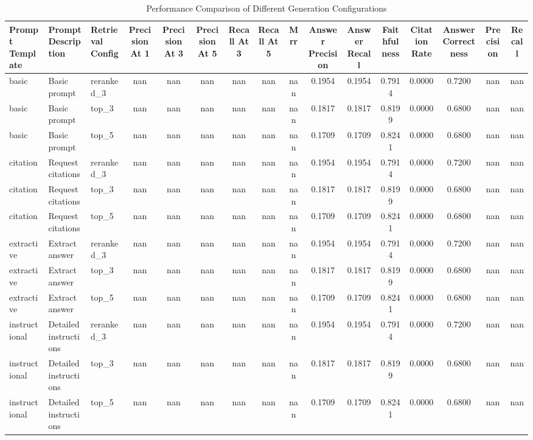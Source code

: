 \begin{table}[htbp]
\caption{Performance Comparison of Different Generation Configurations}
\begin{center}
\begin{tabular}{|l|l|l|c|c|c|c|c|c|c|c|c|c|c|c|c|}
\hline
\textbf{Prompt Template} & \textbf{Prompt Description} & \textbf{Retrieval Config} & \textbf{Precision At 1} & \textbf{Precision At 3} & \textbf{Precision At 5} & \textbf{Recall At 3} & \textbf{Recall At 5} & \textbf{Mrr} & \textbf{Answer Precision} & \textbf{Answer Recall} & \textbf{Faithfulness} & \textbf{Citation Rate} & \textbf{Answer Correctness} & \textbf{Precision} & \textbf{Recall} \\ 
\hline
basic & Basic prompt & reranked_3 & nan & nan & nan & nan & nan & nan & 0.1954 & 0.1954 & 0.7914 & 0.0000 & 0.7200 & nan & nan \\ 
basic & Basic prompt & top_3 & nan & nan & nan & nan & nan & nan & 0.1817 & 0.1817 & 0.8199 & 0.0000 & 0.6800 & nan & nan \\ 
basic & Basic prompt & top_5 & nan & nan & nan & nan & nan & nan & 0.1709 & 0.1709 & 0.8241 & 0.0000 & 0.6800 & nan & nan \\ 
citation & Request citations & reranked_3 & nan & nan & nan & nan & nan & nan & 0.1954 & 0.1954 & 0.7914 & 0.0000 & 0.7200 & nan & nan \\ 
citation & Request citations & top_3 & nan & nan & nan & nan & nan & nan & 0.1817 & 0.1817 & 0.8199 & 0.0000 & 0.6800 & nan & nan \\ 
citation & Request citations & top_5 & nan & nan & nan & nan & nan & nan & 0.1709 & 0.1709 & 0.8241 & 0.0000 & 0.6800 & nan & nan \\ 
extractive & Extract answer & reranked_3 & nan & nan & nan & nan & nan & nan & 0.1954 & 0.1954 & 0.7914 & 0.0000 & 0.7200 & nan & nan \\ 
extractive & Extract answer & top_3 & nan & nan & nan & nan & nan & nan & 0.1817 & 0.1817 & 0.8199 & 0.0000 & 0.6800 & nan & nan \\ 
extractive & Extract answer & top_5 & nan & nan & nan & nan & nan & nan & 0.1709 & 0.1709 & 0.8241 & 0.0000 & 0.6800 & nan & nan \\ 
instructional & Detailed instructions & reranked_3 & nan & nan & nan & nan & nan & nan & 0.1954 & 0.1954 & 0.7914 & 0.0000 & 0.7200 & nan & nan \\ 
instructional & Detailed instructions & top_3 & nan & nan & nan & nan & nan & nan & 0.1817 & 0.1817 & 0.8199 & 0.0000 & 0.6800 & nan & nan \\ 
instructional & Detailed instructions & top_5 & nan & nan & nan & nan & nan & nan & 0.1709 & 0.1709 & 0.8241 & 0.0000 & 0.6800 & nan & nan \\ 
\hline
\end{tabular}
\label{tab:generation}
\end{center}
\end{table}
